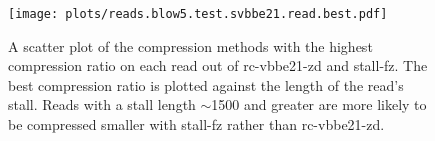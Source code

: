 \begin{figure}
\centering
%
\texttt{[image: plots/reads.blow5.test.svbbe21.read.best.pdf]}
\caption{\label{fig:stall-best}A scatter plot of the compression methods with
the highest compression ratio on each read out of rc-vbbe21-zd and stall-fz. The
best compression ratio is plotted against the length of the read's stall. Reads
with a stall length $\sim$1500 and greater are more likely to be compressed
smaller with stall-fz rather than rc-vbbe21-zd.}
\end{figure}
